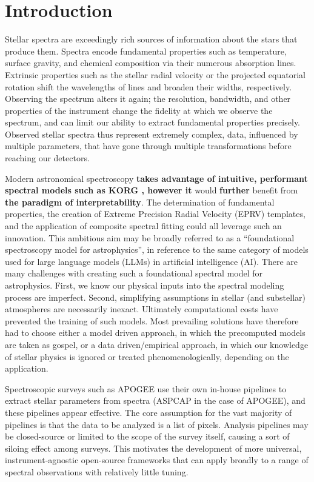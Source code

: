 \documentclass[twocolumn, linenumbers]{aastex631}
\begin{document}
\section{Introduction}
Stellar spectra are exceedingly rich sources of information about the stars that produce them.
Spectra encode fundamental properties such as temperature, surface gravity, and chemical composition via their numerous absorption lines.
Extrinsic properties such as the stellar radial velocity or the projected equatorial rotation shift the wavelengths of lines and broaden their widths, respectively.
Observing the spectrum alters it again; the resolution, bandwidth, and other properties of the instrument change the fidelity at which we observe the spectrum, and can limit our ability to extract fundamental properties precisely.
Observed stellar spectra thus represent extremely complex, data, influenced by multiple parameters, that have gone through multiple transformations before reaching our detectors.

Modern astronomical spectroscopy \textbf{takes advantage of intuitive, performant spectral models such as KORG \citep{korg}, however it} would \textbf{further} benefit from \textbf{the paradigm of interpretability}.
The determination of fundamental properties, the creation of Extreme Precision Radial Velocity (EPRV) templates, and the application of composite spectral fitting could all leverage such an innovation.
This ambitious aim may be broadly referred to as a ``foundational spectroscopy model for astrophysics'', in reference to the same category of models used for large language models (LLMs) in artificial intelligence (AI).
There are many challenges with creating such a foundational spectral model for astrophysics.
First, we know our physical inputs into the spectral modeling process are imperfect.
Second, simplifying assumptions in stellar (and substellar) atmospheres are necessarily inexact.
Ultimately computational costs have prevented the training of such models.
Most prevailing solutions have therefore had to choose either a model driven approach, in which the precomputed models are taken as gospel, or a data driven/empirical approach, in which our knowledge of stellar physics is ignored or treated phenomenologically, depending on the application.

Spectroscopic surveys such as APOGEE \textbf{\citep{APOGEE}} use their own in-house pipelines to extract stellar parameters from spectra (ASPCAP \textbf{\citep{ASPCAP}} in the case of APOGEE), and these pipelines appear effective.
The core assumption for the vast majority of pipelines is that the data to be analyzed is a list of pixels.
Analysis pipelines may be closed-source or limited to the scope of the survey itself, causing a sort of siloing effect among surveys.
This motivates the development of more universal, instrument-agnostic open-source frameworks that can apply broadly to a range of spectral observations with relatively little tuning.
\end{document}
